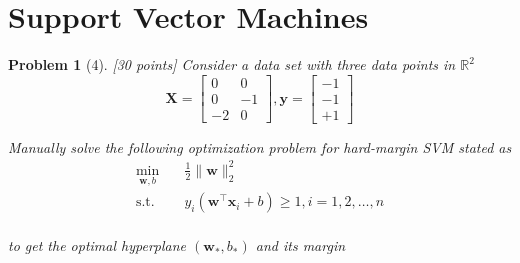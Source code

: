 \documentclass[11pt]{article}
\theoremstyle{quest}
\newtheorem*{problem}{Problem}
\begin{document}
\section*{Support Vector Machines}
\begin{problem}[4] [30 points]
Consider a data set with three data points in $\mathbb{R}^2$
\begin{equation*}
\bm{X} = \begin{bmatrix}
0 & 0  \\
0 & -1 \\
-2 & 0
\end{bmatrix},
\bm{y} = \begin{bmatrix}
-1\\
-1\\
+1
\end{bmatrix}    
\end{equation*}

Manually solve the following optimization problem for hard-margin SVM stated as
\begin{equation*}
\begin{aligned}
\min_{\bm{w},b} \quad & \frac{1}{2}\lVert \bm{w} \rVert_{2}^{2}\\
\textrm{s.t.}   \quad & y_i(\bm{w}^{\top}\bm{x}_i+b)\geq 1, i=1,2,\dots,n\\
\end{aligned}
\end{equation*}

to get the optimal hyperplane $(\bm{w}_{\ast}, b_{\ast})$ and its margin
\end{problem}
\end{document}
